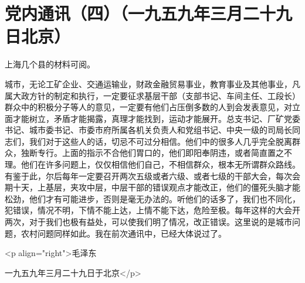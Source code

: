 \section[党内通讯（四）（一九五九年三月二十九日北京）]{党内通讯（四）（一九五九年三月二十九日北京）}


上海几个县的材料可阅。

城市，无论工矿企业、交通运输业，财政金融贸易事业，教育事业及其他事业，凡属大政方针的制定和执行，一定要征求基层干部（支部书记、车间主任、工段长）群众中的积极分子等人的意见，一定要有他们占压倒多数的人到会发表意见，对立面才能树立，矛盾才能揭露，真理才能找到，运动才能展开。总支书记、厂矿党委书记、城市委书记、市委市府所属各机关负责人和党组书记、中央一级的司局长同志们，我们对于这些人的话，切忌不可过分相信。他们中的很多人几乎完全脱离群众，独断专行。上面的指示不合他们胃口的，他们即阳奉阴违，或者简直置之不理。他们在许多问题上，仅仅相信他们自己，不相信群众，根本无所谓群众路线。有鉴于此，尔后每年一定要召开两次五级或者六级、或者七级的干部大会，每次会期十天，上基层，夹攻中层，中层干部的错误观点才能改正，他们的僵死头脑才能松劲，他们才有可能进步，否则是毫无办法的。听他们的话多了，我们也不同化，犯错误，情况不明，下情不能上达，上情不能下达，危险至极。每年这样的大会开两次，对于我们也极有益处，可以使我们明了情况，改正错误。这里说的是城市问题，农村问题同样如此。我在前次通讯中，已经大体说过了。

<p align="right">毛泽东

一九五九年三月二十九日于北京</p>


